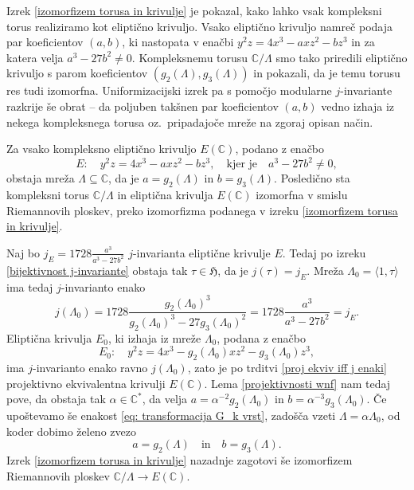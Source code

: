 \documentclass[mat1]{fmfdelo}
\numberwithin{equation}{section}
\newcommand{\C}{\mathbb C}
\newcommand{\HH}{\mathfrak{H}}
\newcommand{\CM}{\mathbb C ^*}
\newcommand{\torus}{\C/\Lambda}
\newcommand{\oz}{oz.\ }
\theoremstyle{definition}
\begin{document}
Izrek \ref{izomorfizem torusa in krivulje} je pokazal, kako lahko vsak kompleksni torus realiziramo kot eliptično krivuljo. Vsako eliptično krivuljo namreč podaja par koeficientov $(a,b)$, ki nastopata v enačbi $y^2z = 4x^3 - axz^2 - bz^3$ in za katera velja $a^3 - 27b^2 \neq 0$. Kompleksnemu torusu $\torus$ smo tako priredili eliptično krivuljo s parom koeficientov $(g_2(\Lambda), g_3(\Lambda))$ in pokazali, da je temu torusu res tudi izomorfna. Uniformizacijski izrek pa s pomočjo modularne $j$-invariante razkrije še obrat -- da poljuben takšnen par koeficientov $(a,b)$ vedno izhaja iz nekega kompleksnega torusa \oz pripadajoče mreže na zgoraj opisan način.


\begin{izrek}[Uniformizacija]
    \label{uniformizacija}
    Za vsako kompleksno eliptično krivuljo $E(\C)$, podano z enačbo
    \[
        E: \quad y^2z = 4x^3 - axz^2 - bz^3, \quad \text{kjer je} \quad a^3 - 27b^2 \neq 0,  
    \]
    obstaja mreža $\Lambda \subseteq \C$, da je $a = g_2(\Lambda)$ in $b = g_3(\Lambda)$. Posledično sta kompleksni torus $\torus$ in eliptična krivulja $E(\C)$ izomorfna v smislu Riemannovih ploskev, preko izomorfizma podanega v izreku \ref{izomorfizem torusa in krivulje}. 
\end{izrek}

\begin{dokaz}
    Naj bo $j_E = 1728\frac{a^3}{a^3 - 27b^2}$ $j$-invarianta eliptične krivulje $E$. Tedaj po izreku \ref{bijektivnost j-invariante} obstaja tak $\tau \in \HH$, da je $j(\tau) = j_E$. Mreža $\Lambda_0 = \langle 1, \tau \rangle$ ima tedaj $j$-invarianto enako
    \[
        j(\Lambda_0) = 1728\frac{g_2(\Lambda_0)^3}{g_2(\Lambda_0)^3 - 27g_3(\Lambda_0)^2} = 1728\frac{a^3}{a^3 - 27b^2} = j_E.  
    \]
    Eliptična krivulja $E_0$, ki izhaja iz mreže $\Lambda_0$, podana z enačbo
    \[
        E_0: \quad y^2z = 4x^3 - g_2(\Lambda_0)xz^2 - g_3(\Lambda_0)z^3, 
    \]
    ima $j$-invarianto enako ravno $j(\Lambda_0)$, zato je po trditvi \ref{proj ekviv iff j enaki} projektivno ekvivalentna krivulji $E(\C)$. Lema \ref{projektivnosti wnf} nam tedaj pove, da obstaja tak $\alpha \in \CM$, da velja $a = \alpha^{-2}g_2(\Lambda_0)$ in $b = \alpha^{-3}g_3(\Lambda_0)$. Če upoštevamo še enakost \eqref{eq: transformacija G_k vrst}, zadošča vzeti $\Lambda = \alpha\Lambda_0$, od koder dobimo želeno zvezo
    \[
        a = g_2(\Lambda) \quad \text{in} \quad b = g_3(\Lambda).  
    \]
    Izrek \ref{izomorfizem torusa in krivulje} nazadnje zagotovi še izomorfizem Riemannovih ploskev $\torus \to E(\C)$.
\end{dokaz}
\end{document}
